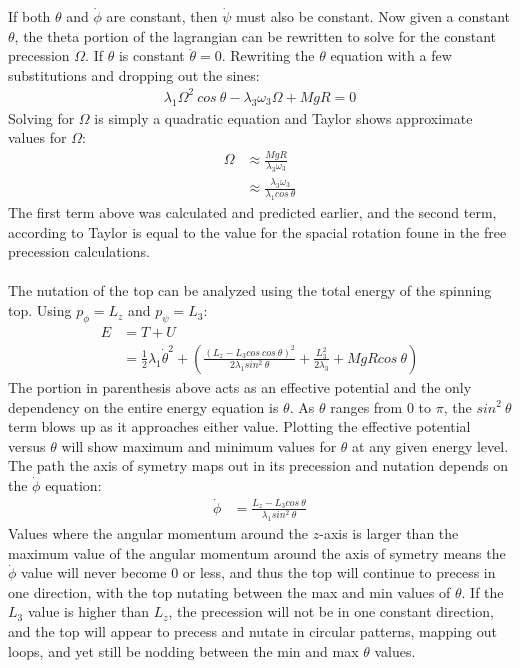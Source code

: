 \documentclass[a4paper,12pt]{article}
\begin{document}
If both $\theta$ and $\dot\phi$ are constant, then $\dot\psi$ must also be constant.  Now given a constant $\theta$, the theta portion of the lagrangian can be rewritten to solve for the constant precession $\Omega$.  If $\theta$ is constant $\ddot\theta=0$.  Rewriting the $\theta$ equation with a few substitutions and dropping out the sines:
\begin{align*}
\lambda_1\Omega^2\ cos\ \theta-\lambda_3\omega_3\Omega+MgR=0
\end{align*}
Solving for $\Omega$ is simply a quadratic equation and Taylor shows approximate values for $\Omega$:
\begin{align*}
\Omega&\approx\frac{MgR}{\lambda_3\omega_3}\\
&\approx\frac{\lambda_3\omega_3}{\lambda_1cos\ \theta}
\end{align*}
The first term above was calculated and predicted earlier, and the second term, according to Taylor is equal to the value for the spacial rotation foune in the free precession calculations.\\
\\
The nutation of the top can be analyzed using the total energy of the spinning top.  Using $p_\phi=L_z$ and $p_\psi=L_3$:
\begin{align*}
E&=T+U\\
&=\frac{1}{2}\lambda_1\dot\theta^2+\left(\frac{(L_z-L_3cos\ cos\ \theta)^2}{2\lambda_1sin^2\ \theta}+\frac{L_3^2}{2\lambda_3}+MgRcos\ \theta\right)
\end{align*}
The portion in parenthesis above acts as an effective potential and the only dependency on the entire energy equation is $\theta$.  As $\theta$ ranges from $0$ to $\pi$, the $sin^2\ \theta$ term blows up as it approaches either value.  Plotting the effective potential versus $\theta$ will show maximum and minimum values for $\theta$ at any given energy level. The path the axis of symetry maps out in its precession and nutation depends on the $\dot\phi$ equation:
\begin{align*}
\dot\phi&=\frac{L_z-L_3cos\ \theta}{\lambda_1sin^2\ \theta}
\end{align*} 
Values where the angular momentum around the $z$-axis is larger than the maximum value of the angular momentum around the axis of symetry means the $\dot\phi$ value will never become 0 or less, and thus the top will continue to precess in one direction, with the top nutating between the max and min values of $\theta$.  If the $L_3$ value is higher than $L_z$, the precession will not be in one constant direction, and the top will appear to precess and nutate in circular patterns, mapping out loops, and yet still be nodding between the min and max $\theta$ values.
\end{document}
